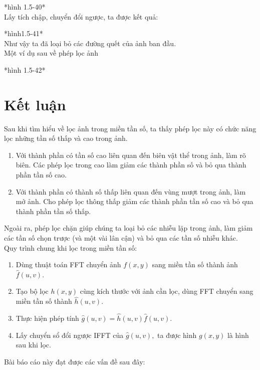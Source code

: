 \documentclass[12pt,a4paper]{report}
\numberwithin{equation}{section}
\theoremstyle{definition} %
\begin{document}
    *hình 1.5-40*
    \\

    Lấy tích chập, chuyển đổi ngược, ta được kết quả:

    *hình1.5-41*
    \\

    Như vậy ta đã loại bỏ các đường quết của ảnh ban đầu.
    \\

    Một ví dụ sau về phép lọc ảnh

    *hình 1.5-42*
	\chapter*{Kết luận}
    Sau khi tìm hiểu về lọc ảnh trong miền tần số, ta thấy phép lọc này có chức năng lọc những tần số thấp và cao trong ảnh.
    \begin{enumerate}
        \item Với thành phần có tần số cao liên quan đến biên vật thể trong ảnh, làm rõ biên. Các phép lọc trong cao làm giảm các thành phần số và bỏ qua thành phần tần số cao.
        \item Với thành phần có thành số thấp liên quan đến vùng mượt trong ảnh, làm mở ảnh. Cho phép lọc thông thấp giảm các thành phần tần số cao và bỏ qua thành phần tần số thấp.
    \end{enumerate}

   Ngoài ra, phép lọc chặn giúp chúng ta loại bỏ các nhiễu lặp trong ảnh, làm giảm các tần số chọn trược (và một vài lân cận) và bỏ qua các tần số nhiễu khác.
   \\

   Quy trình chung khi lọc trong miền tần số:

   \begin{enumerate}
       \item Dùng thuật toán FFT chuyển ảnh $f(x,y)$ sang miền tần số thành ảnh $\hat{f}(u,v)$.
       \item Tạo bộ lọc $h(x,y)$ cùng kích thước với ảnh cần lọc, dùng FFT chuyển sang miền tần số thành $\hat{h}(u,v).$
    \item Thực hiện phép tính $\hat{g}(u,v)=\hat{h}(u,v)\hat{f}(u,v).$
    \item Lấy chuyển sổ đổi ngược IFFT của $\hat{g}(u,v),$ ta được hình $g(x,y)$ là hình sau khi lọc.
   \end{enumerate}
	\indent
	\thispagestyle{fancy}
	

Bài báo cáo này đạt được các vấn đề sau đây:
	
\end{document}
